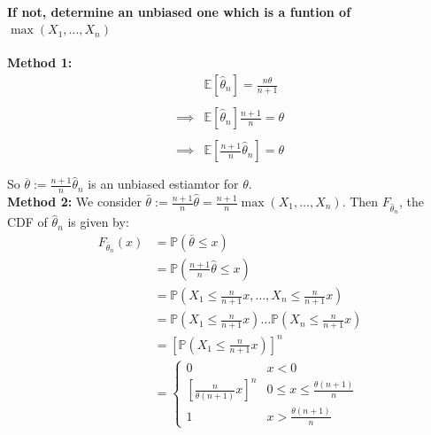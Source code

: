 \documentclass{article}
\renewcommand{\P}{\mathbb{P}}
\newcommand{\E}{\mathbb{E}}
\newcommand{\thetahat}{\hat\theta}
\begin{document}
\paragraph{If not, determine an unbiased one which is a funtion of \(\max(X_1, \ldots, X_n)\)}

\textbf{Method 1:}
\begin{align*}
             & \E[\hat\theta_n] = \frac{n \theta}{n+1} \\                                       \\
    \implies & \E[\hat\theta_n] \frac{n+1}{n} = \theta \\                                       \\
    \implies & \E \left[ \frac{n+1}{n} \hat\theta_n \right] = \theta \\                                       \\
\end{align*}
So \(\overline{\theta} := \frac{n+1}{n} \hat\theta_n\) is an unbiased estiamtor for \(\theta\).\\
\textbf{Method 2:} We consider \(\bar\theta := \frac{n+1}{n} \thetahat = \frac{n+1}{n} \max(X_1, \ldots, X_n)\). Then \(F_{\thetahat_n}\), the CDF of \(\hat\theta_n\) is given by:
\begin{align*}
    F_{\bar \theta_n}(x)
     & = \P \left( \bar\theta \leq x \right)                                                        \\
     & = \P \left( \frac{n+1}{n} \thetahat \leq x \right)                                           \\
     & = \P \left( X_1 \leq \frac{n}{n+1}x, \ldots, X_n \leq \frac{n}{n+1}x \right)                 \\
     & = \P \left( X_1 \leq \frac{n}{n+1}x \right) \ldots \P \left( X_n \leq \frac{n}{n+1}x \right) \\
     & = \left[ \P \left( X_1 \leq \frac{n}{n+1}x \right) \right]^n                                 \\
     & = \begin{cases}
        0                                         & x < 0                               \\
        \left[ \frac{n}{\theta (n+1)} x \right]^n & 0 \leq x \leq \frac{\theta(n+1)}{n} \\
        1                                         & x > \frac{\theta(n+1)}{n}
    \end{cases}                                                                  \\
\end{align*}
\end{document}
